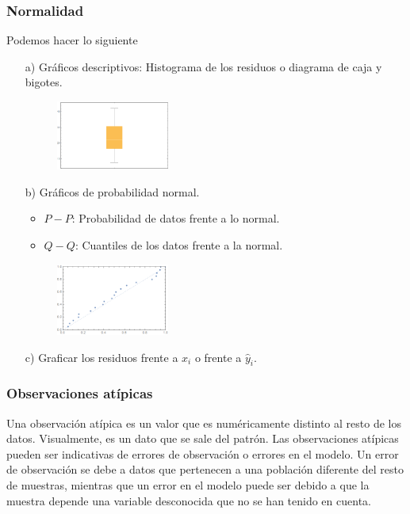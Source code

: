 \subsubsection{Normalidad}
Podemos hacer lo siguiente
\begin{enumerate}
    \item[a)] Gráficos descriptivos: Histograma de los residuos o diagrama de caja y bigotes.
          \begin{figure}[H]
              \centering
              \includegraphics[width=0.35\textwidth]{imagenes1/histo.png}
          \end{figure}
    \item[b)] Gráficos de probabilidad normal.
          \begin{itemize}
              \item $P-P$: Probabilidad de datos frente a lo normal.
              \item $Q-Q$: Cuantiles de los datos frente a la normal.
          \end{itemize}
          \begin{figure}[H]
              \centering
              \includegraphics[width=0.35\textwidth]{imagenes1/probdatos.png}
          \end{figure}
    \item[c)] Graficar los residuos frente a $x_i$ o frente a $\widehat{y}_i$.
\end{enumerate}

\subsubsection{Observaciones atípicas}
Una observación atípica es un valor que es numéricamente distinto al resto de los datos. Visualmente, es un dato que se sale del patrón.
Las observaciones atípicas pueden ser indicativas de errores de observación o errores en el modelo. Un error de observación se debe a datos que pertenecen a una población diferente del resto de muestras, mientras que un error en el modelo puede ser debido a que la muestra depende una variable desconocida que no se han tenido en cuenta.

